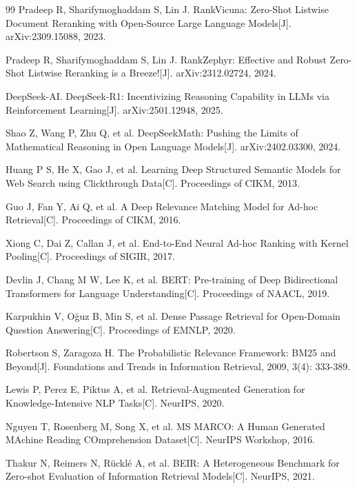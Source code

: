 \documentclass[12pt,a4paper]{article}
\begin{document}
\begin{thebibliography}{99}
 Pradeep R, Sharifymoghaddam S, Lin J. RankVicuna: Zero-Shot Listwise Document Reranking with Open-Source Large Language Models[J]. arXiv:2309.15088, 2023.

 Pradeep R, Sharifymoghaddam S, Lin J. RankZephyr: Effective and Robust Zero-Shot Listwise Reranking is a Breeze![J]. arXiv:2312.02724, 2024.

 DeepSeek-AI. DeepSeek-R1: Incentivizing Reasoning Capability in LLMs via Reinforcement Learning[J]. arXiv:2501.12948, 2025.

 Shao Z, Wang P, Zhu Q, et al. DeepSeekMath: Pushing the Limits of Mathematical Reasoning in Open Language Models[J]. arXiv:2402.03300, 2024.

 Huang P S, He X, Gao J, et al. Learning Deep Structured Semantic Models for Web Search using Clickthrough Data[C]. Proceedings of CIKM, 2013.

 Guo J, Fan Y, Ai Q, et al. A Deep Relevance Matching Model for Ad-hoc Retrieval[C]. Proceedings of CIKM, 2016.

 Xiong C, Dai Z, Callan J, et al. End-to-End Neural Ad-hoc Ranking with Kernel Pooling[C]. Proceedings of SIGIR, 2017.

 Devlin J, Chang M W, Lee K, et al. BERT: Pre-training of Deep Bidirectional Transformers for Language Understanding[C]. Proceedings of NAACL, 2019.

 Karpukhin V, O\u{g}uz B, Min S, et al. Dense Passage Retrieval for Open-Domain Question Answering[C]. Proceedings of EMNLP, 2020.

 Robertson S, Zaragoza H. The Probabilistic Relevance Framework: BM25 and Beyond[J]. Foundations and Trends in Information Retrieval, 2009, 3(4): 333-389.

 Lewis P, Perez E, Piktus A, et al. Retrieval-Augmented Generation for Knowledge-Intensive NLP Tasks[C]. NeurIPS, 2020.

 Nguyen T, Rosenberg M, Song X, et al. MS MARCO: A Human Generated MAchine Reading COmprehension Dataset[C]. NeurIPS Workshop, 2016.

 Thakur N, Reimers N, R\"{u}ckl\'{e} A, et al. BEIR: A Heterogeneous Benchmark for Zero-shot Evaluation of Information Retrieval Models[C]. NeurIPS, 2021.


\end{thebibliography}
\end{document}
